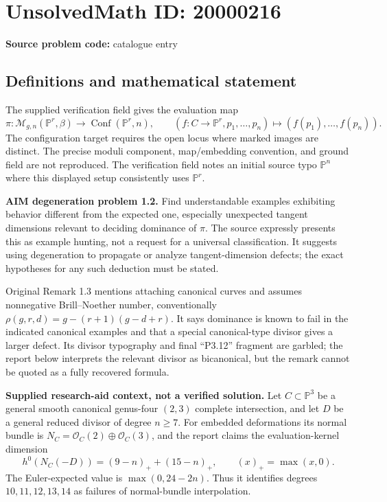 \documentclass[11pt]{article}
\begin{document}
\section*{UnsolvedMath ID: 20000216}
\textbf{Source problem code:} catalogue entry
\subsection{Definitions and mathematical statement}
The supplied verification field gives the evaluation map
\[
 \pi:\mathcal M_{g,n}(\mathbb P^r,\beta)\longrightarrow
 \operatorname{Conf}(\mathbb P^r,n),\qquad
 (f:C\to\mathbb P^r,p_1,\ldots,p_n)\longmapsto(f(p_1),\ldots,f(p_n)).
\]
The configuration target requires the open locus where marked images are distinct. The precise moduli component, map/embedding convention, and ground field are not reproduced. The verification field notes an initial source typo $\mathbb P^n$ where this displayed setup consistently uses $\mathbb P^r$.

\textbf{AIM degeneration problem 1.2.} Find understandable examples exhibiting behavior different from the expected one, especially unexpected tangent dimensions relevant to deciding dominance of $\pi$. The source expressly presents this as example hunting, not a request for a universal classification. It suggests using degeneration to propagate or analyze tangent-dimension defects; the exact hypotheses for any such deduction must be stated.

Original Remark 1.3 mentions attaching canonical curves and assumes nonnegative Brill--Noether number, conventionally $\rho(g,r,d)=g-(r+1)(g-d+r)$. It says dominance is known to fail in the indicated canonical examples and that a special canonical-type divisor gives a larger defect. Its divisor typography and final ``P3.12'' fragment are garbled; the report below interprets the relevant divisor as bicanonical, but the remark cannot be quoted as a fully recovered formula.

\textbf{Supplied research-aid context, not a verified solution.} Let $C\subset\mathbb P^3$ be a general smooth canonical genus-four $(2,3)$ complete intersection, and let $D$ be a general reduced divisor of degree $n\ge7$. For embedded deformations its normal bundle is $N_C=\mathcal O_C(2)\oplus\mathcal O_C(3)$, and the report claims the evaluation-kernel dimension
\[
 h^0(N_C(-D))=(9-n)_++(15-n)_+,
 \qquad(x)_+=\max(x,0).
\]
The Euler-expected value is $\max(0,24-2n)$. Thus it identifies degrees $10,11,12,13,14$ as failures of normal-bundle interpolation.
\end{document}
